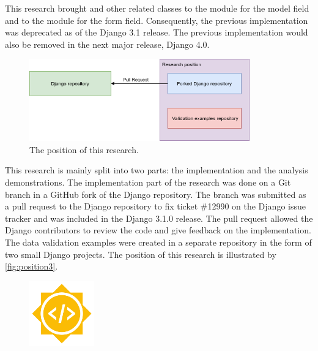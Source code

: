This research brought  and other related classes to the
 module for the model field and to the
 module for the form field. Consequently, the previous
implementation was deprecated as of the Django 3.1 release. The previous
implementation would also be removed in the next major release, Django 4.0.

\begin{figure}
	\centering
    \includegraphics[width=0.85\textwidth]{pics/position3.png}
	\caption{The position of this research.}
	\label{fig:position3}
\end{figure}

This research is mainly split into two parts: the 
implementation and the analysis demonstrations. The 
implementation part of the research was done on a Git branch in a GitHub fork
of the Django repository. The branch was submitted as a pull request to the
Django repository to fix ticket \#12990 on the Django issue tracker
\cite{ticket_12990} and was included in the Django 3.1.0 release. The pull
request allowed the Django contributors to review the code and give feedback
on the implementation. The data validation examples were created in a separate
repository in the form of two small Django projects. The position of this
research is illustrated by \autoref{fig:position3}.

\begin{figure}
	\centering
    \includegraphics[width=0.25\textwidth]{pics/GSoC.png}
	\label{fig:gsoc}
\end{figure}

